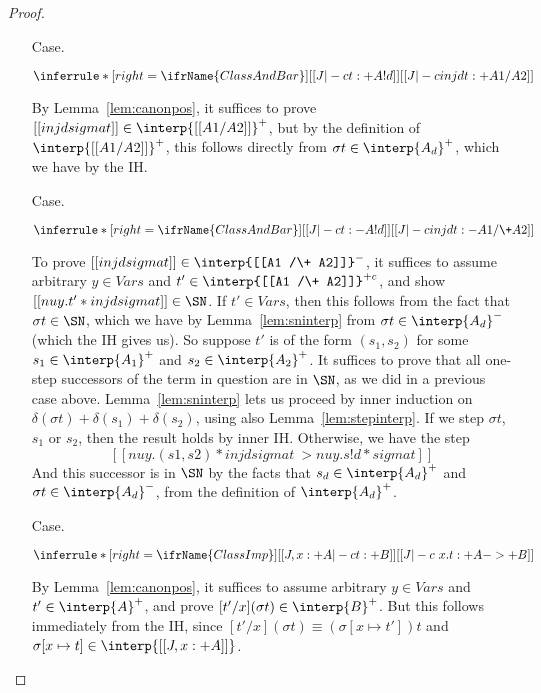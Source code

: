 \begin{proof}
\begin{itemize}
\item[Case.]\ 

\vspace{-.2cm}
\begin{center}
\begin{math}
\inferrule* [right=\ifrName{ClassAndBar}] {[[J |-c t : + A ! d]]}{[[J |-c inj d t : + A1 /\- A2]]}
\end{math}
\end{center}
By Lemma~\ref{lem:canonpos}, it suffices to prove $[[inj d sigma
t]]\in\interp{[[ A1 /\- A2]]}^+$, but by the definition of $\interp{[[
  A1 /\- A2]]}^+$, this follows directly from $\sigma
t\in\interp{A_d}^+$, which we have by the IH.

\item[Case.]\ 

\vspace{-.2cm}
\begin{center}
\begin{math}
\inferrule* [right=\ifrName{ClassAndBar}] {[[J |-c t : - A ! d]]}{[[J |-c inj d t : - A1 /\+ A2]]}
\end{math}
\end{center}
To prove $[[inj d sigma t]]\in\interp{[[A1 /\+ A2]]}^-$, it suffices
to assume arbitrary $y\in\textit{Vars}$ and $t'\in\interp{[[A1 /\+
  A2]]}^{+c}$, and show $[[ nu y . t' * inj d sigma t]]\in\SN$.  If
$t'\in\textit{Vars}$, then this follows from the fact that $\sigma
t\in\SN$, which we have by Lemma~\ref{lem:sninterp} from $\sigma
t\in\interp{A_d}^-$ (which the IH gives us).  So suppose $t'$ is of
the form $(s_1,s_2)$ for some $s_1\in\interp{A_1}^+$ and
$s_2\in\interp{A_2}^+$.  It suffices to prove that all one-step
successors of the term in question are in $\SN$, as we did in a
previous case above.  Lemma~\ref{lem:sninterp} lets us proceed by
inner induction on $\delta(\sigma t) + \delta(s_1) + \delta(s_2)$,
using also Lemma~\ref{lem:stepinterp}.  If we step $\sigma t$, $s_1$
or $s_2$, then the result holds by inner IH.  Otherwise, we have the
step
\[
[[ nu y . (s1,s2) * inj d sigma t ~> nu y . s ! d * sigma t]]
\]
And this successor is in $\SN$ by the facts that $s_d\in\interp{A_d}^+$
and $\sigma t\in\interp{A_d}^-$, from the definition of $\interp{A_d}^+$.

\item[Case.]\ 

\vspace{-.2cm}
\begin{center}
\begin{math}
\inferrule* [right=\ifrName{ClassImp}] {[[J , x : + A |-c t : + B]]}{[[J |-c \ x . t : + A ->+ B]]}
\end{math}
\end{center}
By Lemma~\ref{lem:canonpos}, it suffices to assume arbitrary $y\in\textit{Vars}$ and $t'\in\interp{A}^+$,
and prove $[t'/x](\sigma t)\in\interp{B}^+$.  But this follows immediately from the IH, since
$[t'/x](\sigma t)\equiv (\sigma[x\mapsto t']) t$ and $\sigma[x\mapsto t]\in\interp{[[J , x : + A]]}$.


\end{itemize}
\end{proof}
